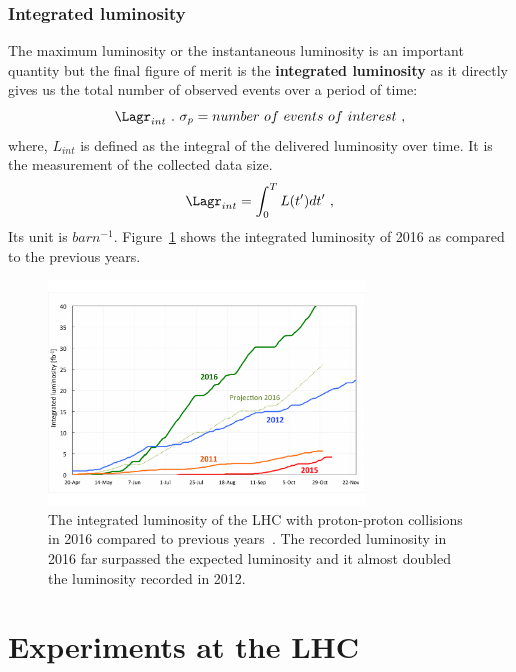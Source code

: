 \subsubsection{Integrated luminosity} %
\label{ssub:integrated_luminosity}
The maximum luminosity or the instantaneous luminosity is an important quantity but the final figure of merit is the \textbf{integrated luminosity} as it directly gives us the total number of observed events over a period of time:
\begin{equation}
	\Lagr_{int}~.~\sigma_p = number~of~events~of~interest~,
\end{equation}
where, $L_{int}$ is defined as the integral of the delivered luminosity over time. It is the measurement of the collected data size.
\begin{equation}
	\Lagr_{int} = \int_0^T L(t')dt'~,
\end{equation}
Its unit is $barn^{-1}$. Figure~\ref{fig:lumi-proj-2016-final-v2} shows the integrated luminosity of 2016 as compared to the previous years.
\begin{figure}[!htbp]
	\centering
	\includegraphics[width=0.75\textwidth]{figures/lumi-proj-2016-final-v2.pdf}
	\caption{The integrated luminosity of the LHC with proton-proton collisions in 2016 compared to previous years~\cite{Pralavorio2016}. The recorded luminosity in 2016 far surpassed the expected luminosity and it almost doubled the luminosity recorded in 2012.}
	\label{fig:lumi-proj-2016-final-v2}
\end{figure}

\section{Experiments at the LHC} %
\label{sec:experiments_at_the_lhc}

